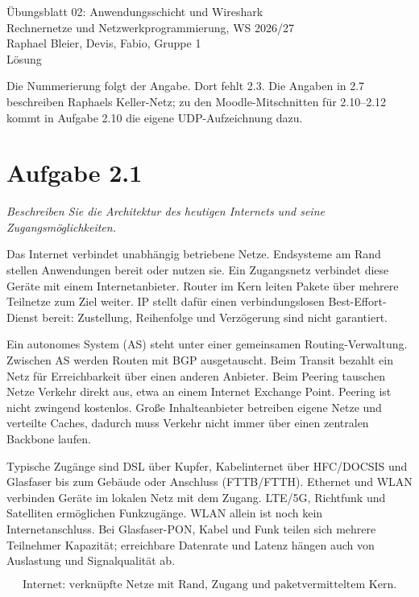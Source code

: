 \documentclass[a4paper,11pt]{article}
\newif\ifexplain
\newcommand{\aufgabe}[1]{\section*{Aufgabe #1}}
\newcommand{\angabe}[1]{{\raggedright\textit{#1}\par}\smallskip}
\newcommand{\explain}[1]{\ifexplain\begin{erklbox}#1\end{erklbox}\fi}
\begin{document}
\begin{center}
{\Large Übungsblatt 02: Anwendungsschicht und Wireshark}\\
Rechnernetze und Netzwerkprogrammierung, WS 2026/27\\
Raphael Bleier, Devis, Fabio, Gruppe 1\\
\ifexplain Erklärung\else Lösung\fi
\end{center}
Die Nummerierung folgt der Angabe. Dort fehlt 2.3. Die Angaben in 2.7 beschreiben Raphaels Keller-Netz; zu den Moodle-Mitschnitten für 2.10–2.12 kommt in Aufgabe 2.10 die eigene UDP-Aufzeichnung dazu.

\aufgabe{2.1}
\angabe{Beschreiben Sie die Architektur des heutigen Internets und seine Zugangsmöglichkeiten.}
Das Internet verbindet unabhängig betriebene Netze. Endsysteme am Rand stellen Anwendungen bereit oder nutzen sie. Ein Zugangsnetz verbindet diese Geräte mit einem Internetanbieter. Router im Kern leiten Pakete über mehrere Teilnetze zum Ziel weiter. IP stellt dafür einen verbindungslosen Best-Effort-Dienst bereit: Zustellung, Reihenfolge und Verzögerung sind nicht garantiert.

Ein autonomes System (AS) steht unter einer gemeinsamen Routing-Verwaltung. Zwischen AS werden Routen mit BGP ausgetauscht. Beim Transit bezahlt ein Netz für Erreichbarkeit über einen anderen Anbieter. Beim Peering tauschen Netze Verkehr direkt aus, etwa an einem Internet Exchange Point. Peering ist nicht zwingend kostenlos. Große Inhalteanbieter betreiben eigene Netze und verteilte Caches, dadurch muss Verkehr nicht immer über einen zentralen Backbone laufen.

Typische Zugänge sind DSL über Kupfer, Kabelinternet über HFC/DOCSIS und Glasfaser bis zum Gebäude oder Anschluss (FTTB/FTTH). Ethernet und WLAN verbinden Geräte im lokalen Netz mit dem Zugang. LTE/5G, Richtfunk und Satelliten ermöglichen Funkzugänge. WLAN allein ist noch kein Internetanschluss. Bei Glasfaser-PON, Kabel und Funk teilen sich mehrere Teilnehmer Kapazität; erreichbare Datenrate und Latenz hängen auch von Auslastung und Signalqualität ab.
\explain{Wir trennen drei Aufgaben: Geräte erzeugen Daten, der Zugang bringt sie zum Anbieter und der Kern transportiert sie weiter. Das ist die Rand/Zugang/Kern-Sicht der VO. Ein AS ist dabei eine Verwaltungsgrenze, kein einzelner Router. Ein CDN (Content Delivery Network) hält Kopien von Inhalten näher bei den Nutzern.}
\[\boxed{\text{Internet: verknüpfte Netze mit Rand, Zugang und paketvermitteltem Kern.}}\]
\end{document}
